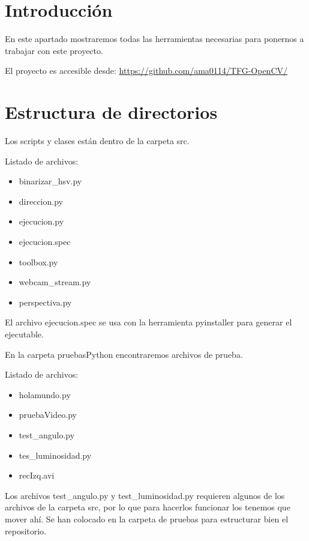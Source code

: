 
\section{Introducción}
En este apartado mostraremos todas las herramientas necesarias para ponernos a trabajar con este proyecto.

El proyecto es accesible desde: \url{https://github.com/ama0114/TFG-OpenCV/}

\section{Estructura de directorios}
Los scripts y clases están dentro de la carpeta src. 

Listado de archivos:
\begin{itemize}

	\item binarizar\_hsv.py
	\item direccion.py
	\item ejecucion.py
	\item ejecucion.spec
	\item toolbox.py
	\item webcam\_stream.py
	\item perspectiva.py
	
\end{itemize}

El archivo ejecucion.spec se usa con la herramienta pyinstaller para generar el ejecutable. 

En la carpeta pruebasPython encontraremos archivos de prueba.

Listado de archivos:
\begin{itemize}

	\item holamundo.py
	\item pruebaVideo.py
	\item test\_angulo.py
	\item tes\_luminosidad.py
	\item recIzq.avi
	
\end{itemize}

Los archivos test\_angulo.py y test\_luminosidad.py requieren algunos de los archivos de la carpeta src, por lo que para hacerlos funcionar los tenemos que mover ahí. Se han colocado en la carpeta de pruebas para estructurar bien el repositorio.

